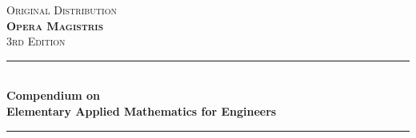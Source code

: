 \documentclass[12pt,a4paper,twoside,openright]{report}
\theoremstyle{definition}
\theoremstyle{itexmp}
\numberwithin{equation}{section}
\begin{document}
	\begin{titlepage}

\newcommand{\HRule}{\rule{\linewidth}{0.5mm}} %

\center %
 

\textsc{\Large Original Distribution}\\[1.5cm] %
\textsc{\Huge \textbf{Opera Magistris}}\\[0.5cm] %
\textsc{\large 3rd Edition}\\[0.5cm] %


\HRule \\[0.4cm]
{ \Large \bfseries Compendium on \\ Elementary Applied Mathematics for Engineers }\\[0.4cm] %
\HRule \\[1.5cm]
 



\end{titlepage}
\end{document}
